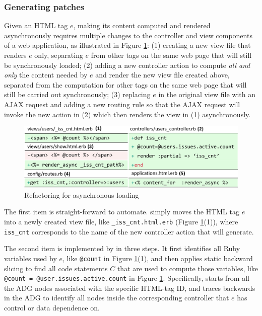 \subsubsection{Generating patches}
Given an HTML tag $e$, making its content computed and rendered
asynchronously requires multiple changes
to the controller and view components of a web application,
as illustrated in Figure \ref{fig:async}:
(1) creating a new view file that renders $e$ only, separating $e$
from other tags on the same web page that will still be synchronously loaded;
(2) adding a new controller action to compute {\it all and only} the content 
needed by $e$ and render the new view file created above, separated from the computation
for other tags on the same web page that will still be carried out synchronously; 
(3) replacing $e$ in the original view file with an AJAX request and 
adding a new routing rule so that the AJAX request will invoke the
new action in (2) which then renders the view in (1) asynchronously.

\begin{figure}
    \centering
    \includegraphics[width=\columnwidth]{panorama-figs/async.pdf}
    \caption{Refactoring for asynchronous loading}
    \label{fig:async}
     \vspace{-0.2in}
\end{figure}

The first item is straight-forward to automate.
\Tool simply moves the HTML tag $e$ into a newly created view file,
like {\tt \_iss\_cnt.html.erb} (Figure \ref{fig:async}(1)), where {\tt iss\_cnt} corresponds to the 
name of the new controller action that \Tool will generate. 



The second item 
is implemented by \Tool in three steps.
It first identifies all Ruby variables
used by $e$, like {\tt @count} in Figure \ref{fig:async}(1), and then
applies static backward slicing to find all code statements $C$
that are used to compute those variables, like
{\tt @count = @user.issues.active.count} in Figure \ref{fig:async}.
Specifically, \Tool starts from all the ADG nodes associated with
the specific HTML-tag ID, and traces backwards in the ADG to identify all nodes inside the corresponding
controller that $e$ has control or data dependence on.

